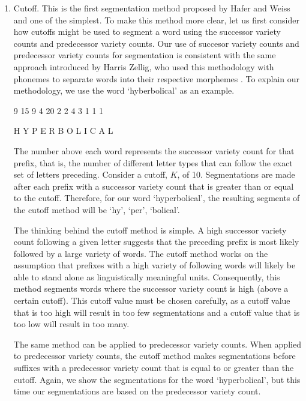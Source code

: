 \documentclass[11pt,letterpaper]{article}
\begin{document}
\begin{enumerate}
  \item Cutoff. This is the first segmentation method proposed by Hafer and Weiss and one of the simplest. To make this method more clear, let us first consider how cutoffs might be used to segment a word using the successor variety counts and predecessor variety counts. Our use of succesor variety counts and predecessor variety counts for segmentation is consistent with the same approach introduced by Harris Zellig, who used this methodology with phonemes to separate words into their respective morphemes \cite{harris1955-phoneme}.  To explain our methodology, we use the word `hyberbolical' as an example. \par

\hfill \hfill 9 \hfill 15 \hfill 9 \hfill 4 \hfill 20 \hfill 2 \hfill 2 \hfill 4 \hfill 3 \hfill 1 \hfill 1 \hfill 1 \hfill \par
\hfill H \hfill Y \hfill P \hfill E \hfill R \hfill B \hfill O \hfill L \hfill I \hfill C \hfill A \hfill L \hfill \hfill

The number above each word represents the successor variety count for that prefix, that is, the number of different letter types that can follow the exact set of letters preceding. Consider a cutoff, $K$, of 10. Segmentations are made after each prefix with a successor variety count that is greater than or equal to the cutoff. Therefore, for our word `hyperbolical', the resulting segments of the cutoff method will be `hy', `per', `bolical'. \par

The thinking behind the cutoff method is simple. A high successor variety count following a given letter suggests that the preceding prefix is most likely followed by a large variety of words. The cutoff method works on the assumption that prefixes with a high variety of following words will likely be able to stand alone as linguistically meaningful units. Consequently, this method segments words where the successor variety count is high (above a certain cutoff). This cutoff value must be chosen carefully, as a cutoff value that is too high will result in too few segmentations and a cutoff value that is too low will result in too many. \par

The same method can be applied to predecessor variety counts. When applied to predecessor variety counts, the cutoff method makes segmentations before suffixes with a predecessor variety count that is equal to or greater than the cutoff. Again, we show the segmentations for the word `hyperbolical', but this time our segmentations are based on the predecessor variety count.


\end{enumerate}
\end{document}
